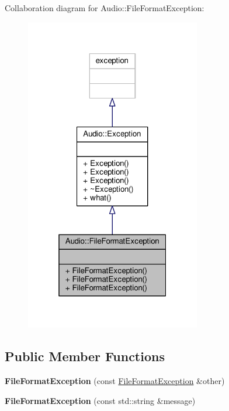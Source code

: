 Collaboration diagram for Audio\+:\+:File\+Format\+Exception\+:
\nopagebreak
\begin{figure}[H]
\begin{center}
\leavevmode
\includegraphics[width=217pt]{d2/da1/classAudio_1_1FileFormatException__coll__graph}
\end{center}
\end{figure}
\subsection*{Public Member Functions}
\begin{DoxyCompactItemize}
\item 
{\bfseries File\+Format\+Exception} (const \hyperlink{classAudio_1_1FileFormatException}{File\+Format\+Exception} \&other)\hypertarget{classAudio_1_1FileFormatException_a3bc471568cb7d535c0f5b30584fae73d}{}\label{classAudio_1_1FileFormatException_a3bc471568cb7d535c0f5b30584fae73d}

\item 
{\bfseries File\+Format\+Exception} (const std\+::string \&message)\hypertarget{classAudio_1_1FileFormatException_a7976fd23b82f76a725248b07aca7a409}{}\label{classAudio_1_1FileFormatException_a7976fd23b82f76a725248b07aca7a409}

\end{DoxyCompactItemize}


